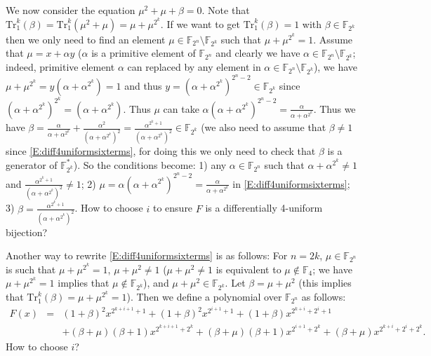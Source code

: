 \documentclass[12pt,a4paper]{ctexbook}
\newcommand{\0}{\textbf{0}}
\newcommand{\1}{\textbf{1}}
\newcommand{\F}{\mathbb{F}}
\begin{document}
    We now consider the equation $\mu^2+\mu+\beta=0$. Note that
    $\mathrm{Tr}_1^k(\beta)=\mathrm{Tr}_1^k(\mu^2+\mu)=\mu+\mu^{2^k}$.
    If we want to get $\mathrm{Tr}_1^k(\beta)=1$ with $\beta\in\F_{2^k}$ then we
    only need to find an element $\mu\in\F_{2^n}\setminus\F_{2^k}$ such that $\mu+\mu^{2^k}=1$.
    Assume that $\mu=x+\alpha y$ ($\alpha$ is a primitive element of $\F_{2^n}$ and clearly we
    have $\alpha\in\F_{2^n}\setminus\F_{2^k}$; indeed, primitive element $\alpha$ can replaced by any element
    in $\alpha\in\F_{2^n}\setminus\F_{2^k}$),
    we have $\mu+\mu^{2^k}=y(\alpha+\alpha^{2^k})=1$ and thus $y=(\alpha+\alpha^{2^k})^{2^n-2}\in\F_{2^k}$
    since $(\alpha+\alpha^{2^k})^{2^k}=(\alpha+\alpha^{2^k})$. Thus $\mu$ can take $\alpha (\alpha+\alpha^{2^k})^{2^n-2}=\frac{\alpha}{\alpha+\alpha^{2^k}}$.
    Thus we have $\beta=\frac{\alpha}{\alpha+\alpha^{2^k}}+\frac{\alpha^2}{(\alpha+\alpha^{2^k})^2}
    =\frac{\alpha^{2^k+1}}{(\alpha+\alpha^{2^k})^2}\in\F_{2^k}$ (we also need to assume that $\beta\not=1$
    since \eqref{E:diff4uniformsixterms}, for doing this we only need to check that $\beta$ is a generator of $\F_{2^k}^*$).
    So the conditions become: 1) any $\alpha\in\F_{2^n}$ such that $\alpha+\alpha^{2^k}\not=1$ and $\frac{\alpha^{2^k+1}}{(\alpha+\alpha^{2^k})^2}\not=1$;
    2) $\mu=\alpha (\alpha+\alpha^{2^k})^{2^n-2}=\frac{\alpha}{\alpha+\alpha^{2^k}}$ in \eqref{E:diff4uniformsixterms};
    3) $\beta=\frac{\alpha^{2^k+1}}{(\alpha+\alpha^{2^k})^2}$.
    How to choose $i$ to ensure $F$ is a differentially 4-uniform bijection?
    
    
    Another way to rewrite \eqref{E:diff4uniformsixterms} is as follows:
    For $n=2k$, $\mu\in\F_{2^n}$ is such that $\mu+\mu^{2^k}=1$, $\mu+\mu^2\not=1$
    ($\mu+\mu^2\not=1$ is equivalent to $\mu\not\in\F_4$;
    we have $\mu+\mu^{2^k}=1$ implies that $\mu\not\in\F_{2^k}$), and $\mu+\mu^2\in\F_{2^k}$.
    Let $\beta=\mu+\mu^2$ (this implies that $\mathrm{Tr}_1^k(\beta)=\mu+\mu^{2^k}=1$).
    Then we define a polynomial over $\F_{2^n}$ as follows:
    \begin{eqnarray}\label{E:diff4uniformsixtermsmu}
    F(x)&=&(1+\beta)^2 x^{2^{k+i+1}+1}+(1+\beta)^2 x^{2^{i+1}+1}+(1+\beta) x^{2^{k+i}+2^i+1}\\
    &&+(\beta+\mu)(\beta+1) x^{2^{k+i+1}+2^k}+(\beta+\mu)(\beta+1) x^{2^{i+1}+2^k}+(\beta+\mu) x^{2^{k+i}+2^i+2^k}\nonumber.
    \end{eqnarray}
    How to choose $i$?
\end{document}
